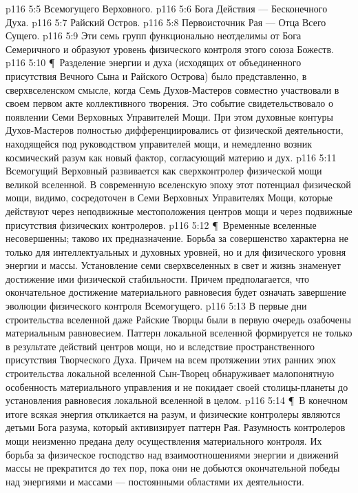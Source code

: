 \vs p116 5:5 \bibnobreakspace Всемогущего Верховного.
\vs p116 5:6 \bibnobreakspace Бога Действия --- Бесконечного Духа.
\vs p116 5:7 \bibnobreakspace Райский Остров.
\vs p116 5:8 \bibnobreakspace Первоисточник Рая --- Отца Всего Сущего.
\vs p116 5:9 Эти семь групп функционально неотделимы от Бога Семеричного и образуют уровень физического контроля этого союза Божеств.
\vs p116 5:10 \P\ Разделение энергии и духа (исходящих от объединенного присутствия Вечного Сына и Райского Острова) было представленно, в сверхвселенском смысле, когда Семь Духов\hyp{}Мастеров совместно участвовали в своем первом акте коллективного творения. Это событие свидетельствовало о появлении Семи Верховных Управителей Мощи. При этом духовные контуры Духов\hyp{}Мастеров полностью дифференциировались от физической деятельности, находящейся под руководством управителей мощи, и немедленно возник космический разум как новый фактор, согласующий материю и дух.
\vs p116 5:11 Всемогущий Верховный развивается как сверхконтролер физической мощи великой вселенной. В современную вселенскую эпоху этот потенциал физической мощи, видимо, сосредоточен в Семи Верховных Управителях Мощи, которые действуют через неподвижные местоположения центров мощи и через подвижные присутствия физических контролеров.
\vs p116 5:12 \P\ Временные вселенные несовершенны; таково их предназначение. Борьба за совершенство характерна не только для интеллектуальных и духовных уровней, но и для физического уровня энергии и массы. Установление семи сверхвселенных в свет и жизнь знаменует достижение ими физической стабильности. Причем предполагается, что окончательное достижение материального равновесия будет означать завершение эволюции физического контроля Всемогущего.
\vs p116 5:13 В первые дни строительства вселенной даже Райские Творцы были в первую очередь озабочены материальным равновесием. Паттерн локальной вселенной формируется не только в результате действий центров мощи, но и вследствие пространственного присутствия Творческого Духа. Причем на всем протяжении этих ранних эпох строительства локальной вселенной Сын\hyp{}Творец обнаруживает малопонятную особенность материального управления и не покидает своей столицы\hyp{}планеты до установления равновесия локальной вселенной в целом.
\vs p116 5:14 \P\ В конечном итоге всякая энергия откликается на разум, и физические контролеры являются детьми Бога разума, который активизирует паттерн Рая. Разумность контролеров мощи неизменно предана делу осуществления материального контроля. Их борьба за физическое господство над взаимоотношениями энергии и движений массы не прекратится до тех пор, пока они не добьются окончательной победы над энергиями и массами --- постоянными областями их деятельности.
